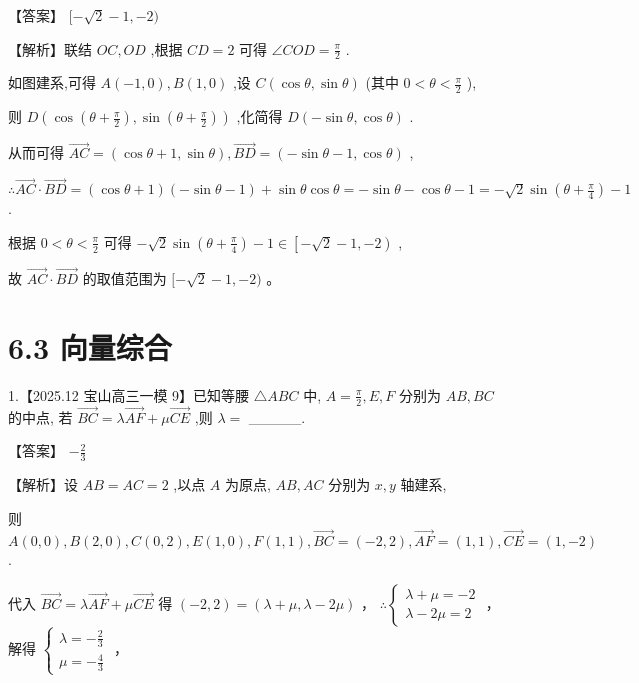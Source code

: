 \documentclass[10pt]{article}
\begin{document}
【答案】 \(\lbrack  - \sqrt{2} - 1, - 2)\)

【解析】联结 \({OC},{OD}\) ,根据 \({CD} = 2\) 可得 \(\angle {COD} = \frac{\pi }{2}\) .

如图建系,可得 \(A\left( {-1,0}\right) ,B\left( {1,0}\right)\) ,设 \(C\left( {\cos \theta ,\sin \theta }\right)\) (其中 \(0 < \theta  < \frac{\pi }{2}\) ),

则 \(D\left( {\cos \left( {\theta  + \frac{\pi }{2}}\right) ,\sin \left( {\theta  + \frac{\pi }{2}}\right) }\right)\) ,化简得 \(D\left( {-\sin \theta ,\cos \theta }\right)\) .

从而可得 \(\overrightarrow{AC} = \left( {\cos \theta  + 1,\sin \theta }\right) ,\overrightarrow{BD} = \left( {-\sin \theta  - 1,\cos \theta }\right)\) ,

\(\therefore \overrightarrow{AC} \cdot  \overrightarrow{BD} = \left( {\cos \theta  + 1}\right) \left( {-\sin \theta  - 1}\right)  + \sin \theta \cos \theta  =  - \sin \theta  - \cos \theta  - 1 =  - \sqrt{2}\sin \left( {\theta  + \frac{\pi }{4}}\right)  - 1\) .

根据 \(0 < \theta  < \frac{\pi }{2}\) 可得 \(- \sqrt{2}\sin \left( {\theta  + \frac{\pi }{4}}\right)  - 1 \in  \left\lbrack  {-\sqrt{2} - 1, - 2}\right)\) ,

故 \(\overrightarrow{AC} \cdot  \overrightarrow{BD}\) 的取值范围为 \(\lbrack  - \sqrt{2} - 1, - 2)\) 。

\section*{6.3 向量综合}

1.【2025.12 宝山高三一模 9】已知等腰 \(\bigtriangleup {ABC}\) 中, \(A = \frac{\pi }{2},E,F\) 分别为 \({AB},{BC}\) 的中点, 若 \(\overrightarrow{BC} = \lambda \overrightarrow{AF} + \mu \overrightarrow{CE}\) ,则 \(\lambda  =\) \_\_\_\_\_.

【答案】 \(- \frac{2}{3}\)

【解析】设 \({AB} = {AC} = 2\) ,以点 \(A\) 为原点, \({AB},{AC}\) 分别为 \(x,y\) 轴建系,

则 \(A\left( {0,0}\right) ,B\left( {2,0}\right) ,C\left( {0,2}\right) ,E\left( {1,0}\right) ,F\left( {1,1}\right) ,\overrightarrow{BC} = \left( {-2,2}\right) ,\overrightarrow{AF} = \left( {1,1}\right) ,\overrightarrow{CE} = \left( {1, - 2}\right)\) .

代入 \(\overrightarrow{BC} = \lambda \overrightarrow{AF} + \mu \overrightarrow{CE}\) 得 \(\left( {-2,2}\right)  = \left( {\lambda  + \mu ,\lambda  - {2\mu }}\right)\) ， \(\therefore \left\{  \begin{array}{l} \lambda  + \mu  =  - 2 \\  \lambda  - {2\mu } = 2 \end{array}\right.\) ，解得 \(\left\{  \begin{array}{l} \lambda  =  - \frac{2}{3} \\  \mu  =  - \frac{4}{3} \end{array}\right.\) ，
\end{document}
